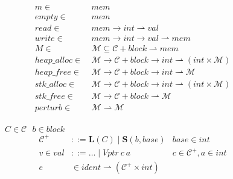 \documentclass{article}
\begin{document}
\begin{figure}
  \begin{minipage}[t]{0.5\textwidth}
    \vspace{0em}
    \[\begin{split}
    m \in ~ & \mathit{mem} \\
    \mathit{empty} \in ~ & \mathit{mem} \\
    \mathit{read} \in ~ & \mathit{mem} \rightarrow \mathit{int} \rightharpoonup \mathit{val} \\
    \mathit{write} \in ~ & \mathit{mem} \rightarrow \mathit{int} \rightarrow \mathit{val}
    \rightharpoonup \mathit{mem} \\
    M \in ~ & \mathcal{M} \subseteq \mathcal{C} + \mathit{block} \rightharpoonup \mathit{mem} \\
    \mathit{heap\_alloc} \in ~ & \mathcal{M} \rightarrow \mathcal{C} + \mathit{block} \rightarrow
    \mathit{int} \rightharpoonup (\mathit{int} \times \mathcal{M}) \\
    \mathit{heap\_free} \in ~ & \mathcal{M} \rightarrow \mathcal{C} + \mathit{block} \rightarrow
    \mathit{int} \rightharpoonup \mathcal{M} \\
    \mathit{stk\_alloc} \in ~ & \mathcal{M} \rightarrow \mathcal{C} + \mathit{block} \rightarrow
    \mathit{int} \rightharpoonup (\mathit{int} \times \mathcal{M}) \\
    \mathit{stk\_free} \in ~ & \mathcal{M} \rightarrow \mathcal{C} + \mathit{block} \rightharpoonup
    \mathcal{M} \\
    \mathit{perturb} \in ~ & \mathcal{M} \rightharpoonup \mathcal{M} \\
    \end{split}\]
  \end{minipage}
  \begin{minipage}[t]{0.49\textwidth}
    \vspace{0em}
    \(C \in \mathcal{C}~~~ b \in \mathit{block}~~~ \)
    \[\begin{aligned}
    \mathcal{C}^+ & ::= \mathbf{L}(C) \mid \mathbf{S}(b, \mathit{base}) &
    \mathit{base} \in \mathit{int} \\
    v \in \mathit{val} & ::= \ldots \mid \mathit{Vptr} ~ c ~ a &
    c \in \mathcal{C}^+, a \in \mathit{int} \\
    e & \in \mathit{ident} \rightharpoonup (\mathcal{C}^+ \times \mathit{int}) \\
    \end{aligned}\]
    \begin{tabular}{l | l}

\end{tabular}
\end{minipage}
\end{figure}
\end{document}
